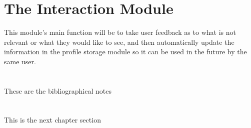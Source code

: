 \section{The Interaction Module}
\label{cap3:sec:interaction}

This module's main function will be to take user feedback as to what is not relevant or what they would like to see, and then automatically update the information in the profile storage module so it can be used in the future by the same user.

\section*{\NotasBibliograficas}
\TocNotasBibliograficas

These are the bibliographical notes
\citep{ldesc2e}

\medskip



\section*{\ProximoCapitulo}
\TocProximoCapitulo

This is the next chapter section

